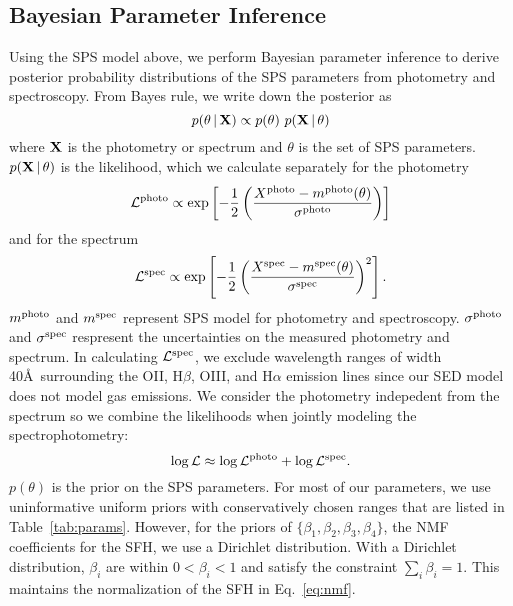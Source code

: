 \subsection{Bayesian Parameter Inference} \label{sec:infer} 
Using the SPS model above, we perform Bayesian parameter inference to derive
posterior probability distributions of the SPS parameters from photometry and
spectroscopy. 
From Bayes rule, we write down the posterior as
\begin{equation} \label{eq:bayes}
    p(\theta\given {\bf X}) \propto p(\theta)~p({\bf X} \given \theta)
\end{equation}
where ${\bf X}$ is the photometry or spectrum and $\theta$ is the set of SPS
parameters. 
$p({\bf X} \,|\, \theta)$ is the likelihood, which we calculate separately for
the photometry
\begin{equation}
    \mathcal{L}^{\rm photo} \propto \exp\left[-\frac{1}{2} \left(\frac{X^{\rm photo} -
    m^{\rm photo}(\theta)}{\sigma^{\rm photo}}\right)\right]
\end{equation}
and for the spectrum
\begin{equation}
    \mathcal{L}^{\rm spec} \propto \exp\left[-\frac{1}{2} \left(\frac{X^{\rm spec} -
    m^{\rm spec}(\theta)}{\sigma^{\rm spec}} \right)^2\right].
\end{equation}
$m^{\rm photo}$ and $m^{\rm spec}$ represent SPS model for photometry and
spectroscopy. 
$\sigma^{\rm photo}$ and $\sigma^{\rm spec}$ respresent the uncertainties on
the measured photometry and spectrum. 
In calculating $\mathcal{L}^{\rm spec}$, we exclude wavelength ranges of width
40\AA~surrounding the OII, H$\beta$, OIII, and H$\alpha$ emission lines since
our SED model does not model gas emissions.
We consider the photometry indepedent from the spectrum so we combine the
likelihoods when jointly modeling the spectrophotometry: 
\begin{equation}
    \log \mathcal{L} \approx \log \mathcal{L}^{\rm photo} + \log
    \mathcal{L}^{\rm spec}.
\end{equation}
$p(\theta)$ is the prior on the SPS parameters. 
For most of our parameters, we use uninformative uniform priors with
conservatively chosen ranges that are listed in Table~\ref{tab:params}. 
However, for the priors of $\{\beta_1, \beta_2, \beta_3, \beta_4 \}$, the NMF coefficients
for the SFH, we use a Dirichlet distribution.  
With a Dirichlet distribution, $\beta_i$ are within $0 < \beta_i < 1$ and
satisfy the constraint $\sum_i \beta_i = 1$. 
This maintains the normalization of the SFH in Eq.~\ref{eq:nmf}. 

